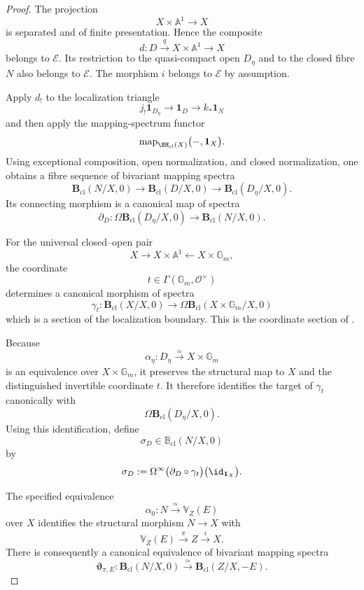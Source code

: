 \begin{proof}
The projection
\[
    X\times\mathbb A^1
    \longrightarrow
    X
\]
is separated and of finite presentation.  Hence the composite
\[
    d:
    D
    \xrightarrow{q}
    X\times\mathbb A^1
    \longrightarrow
    X
\]
belongs to \(\mathcal E\).  Its restriction to the quasi-compact open
\(D_\eta\) and to the closed fibre \(N\) also belongs to
\(\mathcal E\).  The morphism \(i\) belongs to \(\mathcal E\) by
assumption.

Apply \(d_!\) to the localization triangle
\[
    j_!\mathbf1_{D_\eta}
    \longrightarrow
    \mathbf1_D
    \longrightarrow
    k_*\mathbf1_N
\]
and then apply the mapping-spectrum functor
\[
    \operatorname{map}_{\SH_{\mathrm{cl}}(X)}
    \bigl(
      -,
      \mathbf1_X
    \bigr).
\]
Using exceptional composition, open normalization, and closed
normalization, one obtains a fibre sequence of bivariant mapping spectra
\[
    \mathbf B_{\mathrm{cl}}(N/X,0)
    \longrightarrow
    \mathbf B_{\mathrm{cl}}(D/X,0)
    \longrightarrow
    \mathbf B_{\mathrm{cl}}(D_\eta/X,0).
\]
Its connecting morphism is a canonical map of spectra
\[
    \partial_D:
    \Omega
    \mathbf B_{\mathrm{cl}}(D_\eta/X,0)
    \longrightarrow
    \mathbf B_{\mathrm{cl}}(N/X,0).
\]

For the universal closed--open pair
\[
    X
    \longrightarrow
    X\times\mathbb A^1
    \longleftarrow
    X\times\mathbb G_m,
\]
the coordinate
\[
    t\in\Gamma(\mathbb G_m,\mathcal O^\times)
\]
determines a canonical morphism of spectra
\[
    \gamma_t:
    \mathbf B_{\mathrm{cl}}(X/X,0)
    \longrightarrow
    \Omega
    \mathbf B_{\mathrm{cl}}
    (X\times\mathbb G_m/X,0)
\]
which is a section of the localization boundary.  This is the coordinate
section of
\cite[Paragraph~3.2.2]{DegliseJinKhanFundamentalClasses}.

Because
\[
    \alpha_\eta:
    D_\eta
    \xrightarrow{\simeq}
    X\times\mathbb G_m
\]
is an equivalence over \(X\times\mathbb G_m\), it preserves the structural
map to \(X\) and the distinguished invertible coordinate \(t\).  It
therefore identifies the target of \(\gamma_t\) canonically with
\[
    \Omega\mathbf B_{\mathrm{cl}}(D_\eta/X,0).
\]
Using this identification, define
\[
    \sigma_D
    \in
    \mathbb B_{\mathrm{cl}}(N/X,0)
\]
by
\[
    \sigma_D
    :=
    \Omega^\infty
    \bigl(
      \partial_D\circ\gamma_t
    \bigr)
    \bigl(
      \id_{\mathbf1_X}
    \bigr).
\]

The specified equivalence
\[
    \alpha_0:
    N
    \xrightarrow{\simeq}
    \mathbb V_Z(E)
\]
over \(X\) identifies the structural morphism \(N\to X\) with
\[
    \mathbb V_Z(E)
    \xrightarrow{\pi}
    Z
    \xrightarrow{i}
    X.
\]
There is consequently a canonical equivalence of bivariant mapping spectra
\[
    \boldsymbol{\vartheta}_{\pi,E}:
    \mathbf B_{\mathrm{cl}}(N/X,0)
    \xrightarrow{\simeq}
    \mathbf B_{\mathrm{cl}}(Z/X,-E).
\]


\end{proof}
